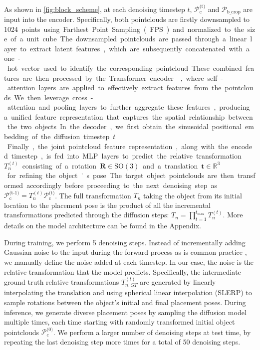  As shown in \autoref{fig:block_scheme}, at each denoising timestep \( t \), \( \mathcal{P}_{\text{c}}^{\text{(t)}} \) and \( \mathcal{P}_{\text{b\_crop}}\) are input into the encoder. Specifically, both pointclouds are firstly downsampled to \SI{1024} points using Farthest Point Sampling (FPS) and normalized to the size of a unit cube. The downsampled pointclouds are passed through a linear layer to extract latent features, which are subsequently concatenated with a one-hot vector used to identify the corresponding pointcloud. These combined features are then processed by the Transformer encoder \cite{10.5555/3295222.3295349, chen2022neural}, where self-attention layers are applied to effectively extract features from the pointclouds. We then leverage cross-attention and pooling layers to further aggregate these features, producing a unified feature representation that captures the spatial relationship between the two objects. In the decoder, we first obtain the sinusoidal positional embedding of the diffusion timestep \(t\). Finally, the joint pointcloud feature representation, along with the encoded timestep, is fed into MLP layers to predict the relative transformation \( {T}_{n}^{(t)} \) consisting of a rotation \( \mathbf{R} \in \text{SO}(3) \) and a translation \( \mathbf{t} \in \mathbb{R}^3 \) for refining the object's pose. The target object pointclouds are then transformed accordingly before proceeding to the next denoising step as $ \mathcal{P}_{\text{c}}^{\text{(t-1)}} =  {T}_{n}^{(t)} \mathcal{P}_{\text{c}}^{\text{(t)}}$.
 The full transformation \( T_n \) taking the object from its initial location to the placement pose is the product of all the incremental transformations predicted through the diffusion steps: \( T_n = \prod_{t=1}^{t_{\max}} T_n^{(t)} \).
 More details on the model architecture can be found in the Appendix. 
 
 During training, we perform 5 denoising steps. Instead of incrementally adding Gaussian noise to the input during the forward process as is common practice \cite{10.5555/3495724.3496298}, we manually define the noise added at each timestep. In our case, the noise is the relative transformation that the model predicts. Specifically, the intermediate ground truth relative transformations \({T}_{n, GT}^{(t)} \) are generated by linearly interpolating the translation and using spherical linear interpolation (SLERP) to sample rotations between the object's initial and final placement poses. During inference, we generate diverse placement poses by sampling the diffusion model multiple times, each time starting with randomly transformed initial object pointclouds \( \mathcal{P}_{\text{c}}^{\text{(0)}} \).
We perform a larger number of denoising steps at test time, by repeating the last denoising step more times for a total of 50 denoising steps.


